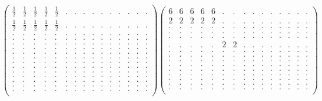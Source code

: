 \documentclass[12pt,a4paper]{amsart}
\begin{document}
\begin{align*}
\left(\begin{array}{rrrrrrrrrrrrrrr}%
\frac12&\frac12&\frac12&\frac12&\frac12&.&.&.&.&.&.&.&.&.&.\\%
\frac12&\frac12&\frac12&\frac12&\frac12&.&.&.&.&.&.&.&.&.&.\\%
.&.&.&.&.&.&.&.&.&.&.&.&.&.&.\\%
.&.&.&.&.&.&.&.&.&.&.&.&.&.&.\\%
.&.&.&.&.&.&.&.&.&.&.&.&.&.&.\\%
.&.&.&.&.&.&.&.&.&.&.&.&.&.&.\\%
.&.&.&.&.&.&.&.&.&.&.&.&.&.&.\\%
.&.&.&.&.&.&.&.&.&.&.&.&.&.&.\\%
.&.&.&.&.&.&.&.&.&.&.&.&.&.&.\\%
.&.&.&.&.&.&.&.&.&.&.&.&.&.&.\\%
.&.&.&.&.&.&.&.&.&.&.&.&.&.&.\\%
.&.&.&.&.&.&.&.&.&.&.&.&.&.&.\\%
.&.&.&.&.&.&.&.&.&.&.&.&.&.&.\\%
.&.&.&.&.&.&.&.&.&.&.&.&.&.&.\\%
.&.&.&.&.&.&.&.&.&.&.&.&.&.&.\\%
\end{array}\right)%
\left(\begin{array}{rrrrrrrrrrrrrrr}%
6&6&6&6&6&.&.&.&.&.&.&.&.&.&.\\%
2&2&2&2&2&.&.&.&.&.&.&.&.&.&.\\%
.&.&.&.&.&.&.&.&.&.&.&.&.&.&.\\%
.&.&.&.&.&.&.&.&.&.&.&.&.&.&.\\%
.&.&.&.&.&.&.&.&.&.&.&.&.&.&.\\%
.&.&.&.&.&2&2&.&.&.&.&.&.&.&.\\%
.&.&.&.&.&.&.&.&.&.&.&.&.&.&.\\%
.&.&.&.&.&.&.&.&.&.&.&.&.&.&.\\%
.&.&.&.&.&.&.&.&.&.&.&.&.&.&.\\%
.&.&.&.&.&.&.&.&.&.&.&.&.&.&.\\%
.&.&.&.&.&.&.&.&.&.&.&.&.&.&.\\%
.&.&.&.&.&.&.&.&.&.&.&.&.&.&.\\%
.&.&.&.&.&.&.&.&.&.&.&.&.&.&.\\%
.&.&.&.&.&.&.&.&.&.&.&.&.&.&.\\%
.&.&.&.&.&.&.&.&.&.&.&.&.&.&.\\%
\end{array}\right)%
\end{align*}
\end{document}

